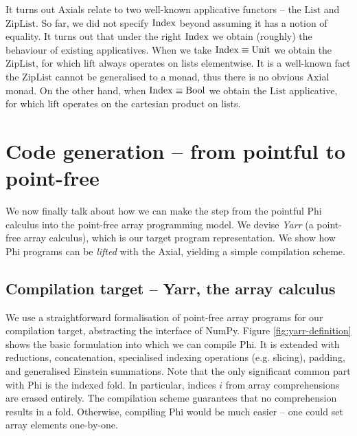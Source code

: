 It turns out Axials relate to two well-known applicative functors -- the $\mathrm{List}$ and $\mathrm{ZipList}$. 
So far, we did not specify $\mathrm{Index}$ beyond assuming it has a notion of equality. 
It turns out that under the right $\mathrm{Index}$ we obtain (roughly) the behaviour of existing applicatives.
When we take $\mathrm{Index} \equiv \mathrm{Unit}$ we obtain the $\mathrm{ZipList}$, for which $\mathrm{lift}$ always operates on lists elementwise.
It is a well-known fact the $\mathrm{ZipList}$ cannot be generalised to a monad, thus there is no obvious Axial monad.
On the other hand, when $\mathrm{Index} \equiv \mathrm{Bool}$ we obtain the $\mathrm{List}$ applicative, for which $\mathrm{lift}$ operates on the cartesian product on lists. 

\section{Code generation -- from pointful to point-free}
\label{codegen}

We now finally talk about how we can make the step from the pointful Phi calculus into the point-free array programming model. 
We devise \textit{Yarr} (a point-free array calculus), which is our target program representation. 
We show how Phi programs can be \textit{lifted} with the Axial, yielding a simple compilation scheme.

\subsection{Compilation target -- Yarr, the array calculus}
\label{yarr}

We use a straightforward formalisation of point-free array programs for our compilation target, abstracting the interface of NumPy.
Figure \ref{fig:yarr-definition} shows the basic formulation into which we can compile Phi. It is extended with reductions, concatenation, specialised indexing operations (e.g. slicing), padding, and generalised Einstein summations. Note that the only significant common part with Phi is the indexed fold. In particular, indices $i$ from array comprehensions are erased entirely. The compilation scheme guarantees that no comprehension results in a fold. Otherwise, compiling Phi would be much easier -- one could set array elements one-by-one.


